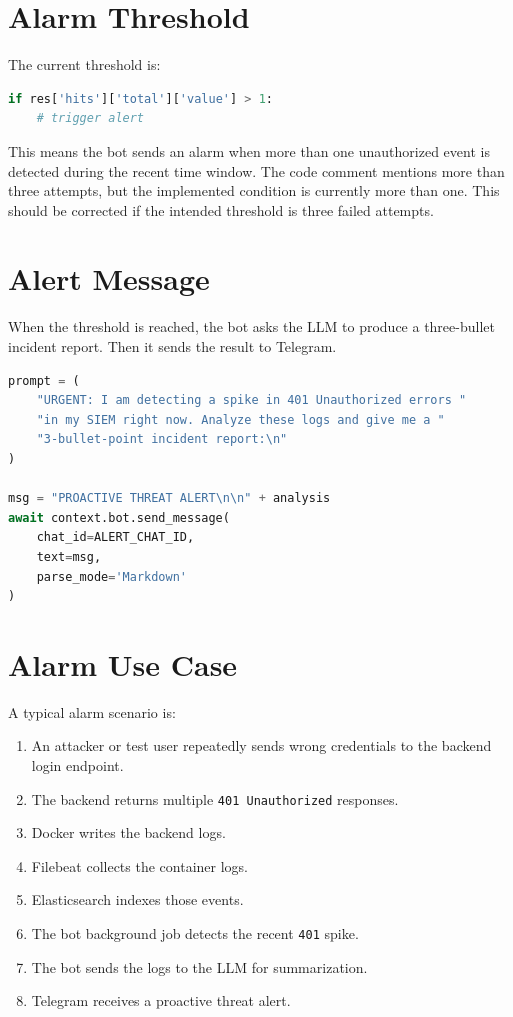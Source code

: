 \documentclass[12pt,a4paper]{report}
\begin{document}
\section{Alarm Threshold}

The current threshold is:

\begin{lstlisting}[language=Python,caption={Alarm threshold}]
if res['hits']['total']['value'] > 1:
    # trigger alert
\end{lstlisting}

This means the bot sends an alarm when more than one unauthorized event is detected during the recent time window. The code comment mentions more than three attempts, but the implemented condition is currently more than one. This should be corrected if the intended threshold is three failed attempts.

\section{Alert Message}

When the threshold is reached, the bot asks the LLM to produce a three-bullet incident report. Then it sends the result to Telegram.

\begin{lstlisting}[language=Python,caption={Proactive alert message}]
prompt = (
    "URGENT: I am detecting a spike in 401 Unauthorized errors "
    "in my SIEM right now. Analyze these logs and give me a "
    "3-bullet-point incident report:\n"
)

msg = "PROACTIVE THREAT ALERT\n\n" + analysis
await context.bot.send_message(
    chat_id=ALERT_CHAT_ID,
    text=msg,
    parse_mode='Markdown'
)
\end{lstlisting}

\section{Alarm Use Case}

A typical alarm scenario is:

\begin{enumerate}[leftmargin=*]
    \item An attacker or test user repeatedly sends wrong credentials to the backend login endpoint.
    \item The backend returns multiple \texttt{401 Unauthorized} responses.
    \item Docker writes the backend logs.
    \item Filebeat collects the container logs.
    \item Elasticsearch indexes those events.
    \item The bot background job detects the recent \texttt{401} spike.
    \item The bot sends the logs to the LLM for summarization.
    \item Telegram receives a proactive threat alert.
\end{enumerate}
\end{document}
